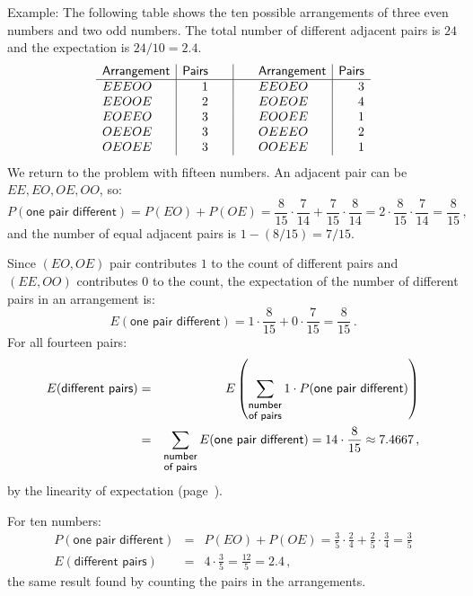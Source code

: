 Example: The following table shows the ten possible arrangements of three even numbers and two odd numbers. The total number of different adjacent pairs is $24$ and the expectation is $24/10=2.4$.
\[
\begin{array}{l|r@{\hspace{2em}}|@{\hspace{2em}}l|r}
\textsf{Arrangement}&\textsf{Pairs}&\textsf{Arrangement}&\textsf{Pairs}\\\hline
EEEOO & 1&
EEOEO & 3\\
EEOOE & 2&
EOEOE & 4\\
EOEEO & 3&
EOOEE & 1\\
OEEOE & 3&
OEEEO & 2\\
OEOEE & 3&
OOEEE & 1\\
\end{array}
\]
We return to the problem with fifteen numbers. An adjacent pair can be $EE, EO, OE, OO$, so:
\[
P(\textsf{one pair different}) = P(EO) + P(OE) = \frac{8}{15}\cdot \frac{7}{14} + \frac{7}{15}\cdot \frac{8}{14} = 2\cdot \frac{8}{15}\cdot \frac{7}{14} = \frac{8}{15}\,,
\]
and the number of equal adjacent pairs is $1-(8/15)=7/15$.

Since $(EO,OE)$ pair contributes $1$ to the count of different pairs and $(EE,OO)$ contributes $0$ to the count, the expectation of the number of different pairs in an arrangement is:
\[
E(\textsf{one pair different}) = 1\cdot\frac{8}{15}+ 0\cdot\frac{7}{15}=\frac{8}{15}\,.
\]
For all fourteen pairs:
\begin{eqnarray*}
E(\textsf{different pairs}) &=&
E\left(\sum_{\shortstack{\textsf{\footnotesize number}\\\textsf{\footnotesize of pairs}}} 1\cdot P(\textsf{one pair different})\right)\\
&=& \sum_{\shortstack{\textsf{\footnotesize number}\\\textsf{\footnotesize of pairs}}} E(\textsf{one pair different}) = 14\cdot \frac{8}{15} \approx 7.4667\,,
\end{eqnarray*}
by the linearity of expectation (page~\pageref{p.linearity}).

For ten numbers:
\begin{eqnarray*}
P(\textsf{one pair different}) &=& P(EO) + P(OE) = \frac{3}{5}\cdot \frac{2}{4} + \frac{2}{5}\cdot \frac{3}{4} = \frac{3}{5}\\
E(\textsf{different pairs}) &=& 4\cdot \frac{3}{5}=\frac{12}{5}=2.4\,,
\end{eqnarray*}
the same result found by counting the pairs in the arrangements.


